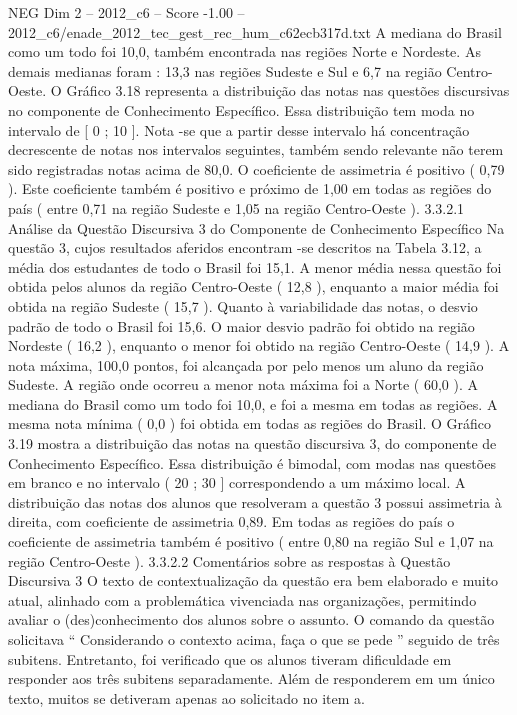 \begin{textsample}{NEG Dim 2 – 2012\_c6 – Score -1.00 – 2012\_c6/enade\_2012\_tec\_gest\_rec\_hum\_c62ecb317d.txt}
A mediana do Brasil como um todo foi 10,0, também encontrada nas regiões Norte e Nordeste.
As demais medianas foram : 13,3 nas regiões Sudeste e Sul e 6,7 na região Centro-Oeste.
O Gráfico 3.18 representa a distribuição das notas nas questões discursivas no componente de Conhecimento Específico.
Essa distribuição tem moda no intervalo de [ 0 ; 10 ].
Nota -se que a partir desse intervalo há concentração decrescente de notas nos intervalos seguintes, também sendo relevante não terem sido registradas notas acima de 80,0.
O coeficiente de assimetria é positivo ( 0,79 ).
Este coeficiente também é positivo e próximo de 1,00 em todas as regiões do país ( entre 0,71 na região Sudeste e 1,05 na região Centro-Oeste ). 3.3.2.1 Análise da Questão Discursiva 3 do Componente de Conhecimento Específico Na questão 3, cujos resultados aferidos encontram -se descritos na Tabela 3.12, a média dos estudantes de todo o Brasil foi 15,1.
A menor média nessa questão foi obtida pelos alunos da região Centro-Oeste ( 12,8 ), enquanto a maior média foi obtida na região Sudeste ( 15,7 ).
Quanto à variabilidade das notas, o desvio padrão de todo o Brasil foi 15,6.
O maior desvio padrão foi obtido na região Nordeste ( 16,2 ), enquanto o menor foi obtido na região Centro-Oeste ( 14,9 ).
A nota máxima, 100,0 pontos, foi alcançada por pelo menos um aluno da região Sudeste.
A região onde ocorreu a menor nota máxima foi a Norte ( 60,0 ).
A mediana do Brasil como um todo foi 10,0, e foi a mesma em todas as regiões.
A mesma nota mínima ( 0,0 ) foi obtida em todas as regiões do Brasil.
O Gráfico 3.19 mostra a distribuição das notas na questão discursiva 3, do componente de Conhecimento Específico.
Essa distribuição é bimodal, com modas nas questões em branco e no intervalo ( 20 ; 30 ] correspondendo a um máximo local.
A distribuição das notas dos alunos que resolveram a questão 3 possui assimetria à direita, com coeficiente de assimetria 0,89.
Em todas as regiões do país o coeficiente de assimetria também é positivo ( entre 0,80 na região Sul e 1,07 na região Centro-Oeste ). 3.3.2.2 Comentários sobre as respostas à Questão Discursiva 3 O texto de contextualização da questão era bem elaborado e muito atual, alinhado com a problemática vivenciada nas organizações, permitindo avaliar o (des)conhecimento dos alunos sobre o assunto.
O comando da questão solicitava “ Considerando o contexto acima, faça o que se pede ” seguido de três subitens.
Entretanto, foi verificado que os alunos tiveram dificuldade em responder aos três subitens separadamente.
Além de responderem em um único texto, muitos se detiveram apenas ao solicitado no item a.

\end{textsample}
